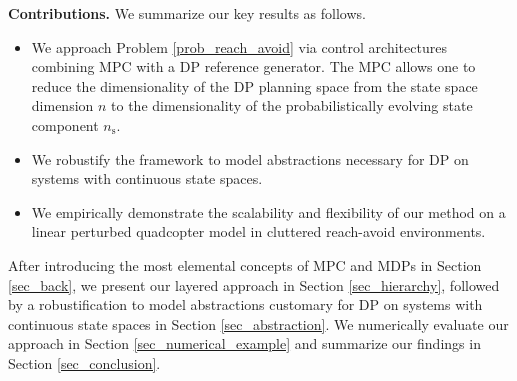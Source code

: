 \documentclass{IEEEtran}
\begin{document}


\textbf{Contributions.} We summarize our key results as follows.
\begin{itemize}%
    \item We approach Problem \ref{prob_reach_avoid} via control architectures combining MPC with a DP reference generator. The MPC allows one to reduce the dimensionality of the DP planning space from the state space dimension $n$ to the dimensionality of the probabilistically evolving state component $n_{\text{s}}$.
    \item We robustify the framework to model abstractions necessary for DP on systems with continuous state spaces.
    \item We empirically demonstrate the scalability and flexibility of our method on a linear perturbed quadcopter model in cluttered reach-avoid environments.
\end{itemize}

After introducing the most elemental concepts of MPC and MDPs in Section \ref{sec_back}, we present our layered approach in Section \ref{sec_hierarchy}, followed by a robustification to model abstractions customary for DP on systems with continuous state spaces in Section \ref{sec_abstraction}. We numerically evaluate our approach in Section \ref{sec_numerical_example} and summarize our findings in Section \ref{sec_conclusion}.
\end{document}
